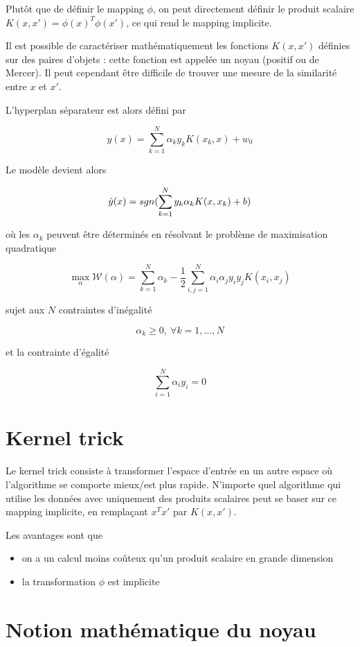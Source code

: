 Plutôt que de définir le mapping $\phi$, on peut directement définir le produit scalaire $K(x, x') = \phi(x)^T \phi(x')$, ce qui rend le mapping implicite.

Il est possible de caractériser mathématiquement les fonctions $K(x, x')$ définies sur des paires d'objets : cette fonction est appelée un noyau (positif ou de Mercer). Il peut cependant être difficile de trouver une mesure de la similarité entre $x$ et $x'$.

L'hyperplan séparateur est alors défini par

$$y(x) = \sum_{k = 1}^N \alpha_k y_k K(x_k, x) + w_0$$

Le modèle devient alors

$$\hat{y}(x) = sgn(\sum_{k = 1}^N y_k \alpha_k K(x, x_k) + b)$$

où les $\alpha_k$ peuvent être déterminés en résolvant le problème de maximisation quadratique 

$$\max_\alpha \mathcal{W}(\alpha) = \sum_{k = 1}^N \alpha_k - \frac{1}{2} \sum_{i, j = 1}^N \alpha_i \alpha_j y_i y_j K(x_i, x_j)$$

sujet aux $N$ contraintes d'inégalité

$$\alpha_k \geq 0, \: \forall k = 1, \dots , N$$

et la contrainte d'égalité

$$\sum_{i = 1}^N \alpha_i y_i = 0$$

\section{Kernel trick}

Le kernel trick consiste à transformer l'espace d'entrée en un autre espace où l'algorithme se comporte mieux/est plus rapide. N'importe quel algorithme qui utilise les données avec uniquement des produits scalaires peut se baser sur ce mapping implicite, en remplaçant $x^Tx'$ par $K(x, x')$. 

Les avantages sont que

\begin{itemize}
	\item on a un calcul moins coûteux qu'un produit scalaire en grande dimension
	\item la transformation $\phi$ est implicite
\end{itemize}

\section{Notion mathématique du noyau}

